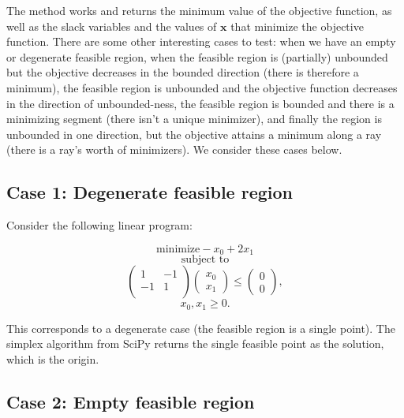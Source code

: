 \documentclass[12pt,english]{article}
\begin{document}
The method works and returns the minimum value of the objective function, as well as the slack variables and the values of $\mathbf{x}$ that minimize the objective function.  There are some other interesting cases to test: when we have an empty or degenerate feasible region, when the feasible region is (partially) unbounded but the objective decreases in the bounded direction (there is therefore a minimum), the feasible region is unbounded and the objective function decreases in the direction of unbounded-ness, the feasible region is bounded and there is a minimizing segment (there isn't a unique minimizer), and finally the region is unbounded in one direction, but the objective attains a minimum along a ray (there is a ray's worth of minimizers).  We consider these cases below.

\subsection*{Case 1: Degenerate feasible region}

Consider the following linear program:

$$
\text{minimize} -x_0 + 2x_1
$$
$$
\text{subject to}
$$
$$
\left(
\begin{array}{cc}
1	&	-1 	\\
-1 	&	1     	\\
\end{array}
\right)
\left(
\begin{array}{c}
x_0 \\
x_1
\end{array}
\right)
\leq
\left(
\begin{array}{c}
0 \\
0
\end{array}
\right),
$$
$$
x_0, x_1 \geq 0.
$$

This corresponds to a degenerate case (the feasible region is a single point).  The simplex algorithm from SciPy returns the single feasible point as the solution, which is the origin.

\subsection*{Case 2: Empty feasible region}
\end{document}
